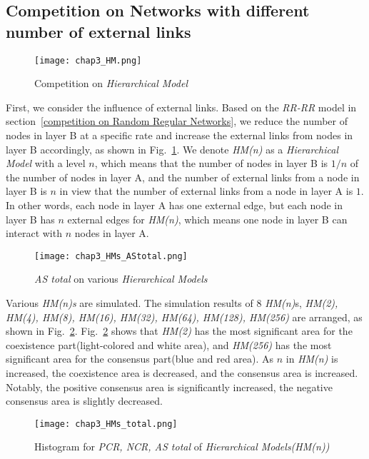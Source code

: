 \subsection{Competition on Networks with different number of external links}

\begin{figure}[!htb]
	\centering
	\texttt{[image: chap3\_HM.png]}
	\caption{Competition on \textit{Hierarchical Model}}
	\label{chap3_HM}
\end{figure}
First, we consider the influence of external links. Based on the \textit{RR-RR} model in section~\ref{competition on Random Regular Networks}, we reduce the number of nodes in layer B at a specific rate and increase the external links from nodes in layer B accordingly, as shown in Fig.~\ref{chap3_HM}.  We denote \textit{HM(n)} as a \textit{Hierarchical Model} with a level $n$, which means that the number of nodes in layer B is $1/n$ of the number of nodes in layer A, and the number of external links from a node in layer B is $n$ in view that the number of external links from a node in layer A is $1$. In other words, each node in layer A has one external edge, but each node in layer B has $n$ external edges for \textit{HM(n)}, which means one node in layer B can interact with $n$ nodes in layer A.

\begin{figure}[!htb]
	\centering
	\texttt{[image: chap3\_HMs\_AStotal.png]}
	\caption{\textit{AS total} on various \textit{Hierarchical Models}}
	\label{chap3_HMs_AStotal}
\end{figure}

Various \textit{HM(n)s} are simulated.  The simulation results of $8$ \textit{HM(n)}s, \textit{HM(2), HM(4), HM(8), HM(16), HM(32), HM(64), HM(128), HM(256)} are arranged, as shown in Fig.~\ref{chap3_HMs_AStotal}. Fig.~\ref{chap3_HMs_AStotal} shows that \textit{HM(2)} has the most significant area for the coexistence part(light-colored and white area), and \textit{HM(256)} has the most significant area for the consensus part(blue and red area). As $n$ in \textit{HM(n)} is increased, the coexistence area is decreased, and the consensus area is increased. Notably, the positive consensus area is significantly increased, the negative consensus area is slightly decreased.

\begin{figure}[!htb]
	\centering
	\texttt{[image: chap3\_HMs\_total.png]}
	\caption{Histogram for \textit{PCR, NCR, AS total} of \textit{Hierarchical Models(HM(n))}}
	\label{chap3_HMs_total}
\end{figure}

